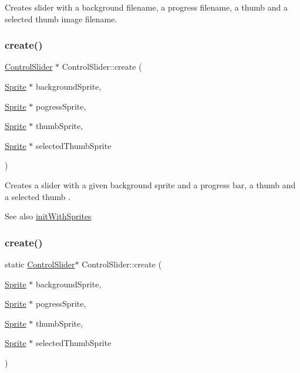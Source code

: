 Creates slider with a background filename, a progress filename, a thumb and a selected thumb image filename. \mbox{\label{classControlSlider_aff78b4e336dd49834bcf0b6982ab620e}} 
\subsubsection{\texorpdfstring{create()}{create()}\hspace{0.1cm}{\footnotesize\ttfamily [7/8]}}
{\footnotesize\ttfamily \hyperlink{classControlSlider}{Control\+Slider} $\ast$ Control\+Slider\+::create (\begin{DoxyParamCaption}\item[{\hyperlink{classSprite}{Sprite} $\ast$}]{background\+Sprite,  }\item[{\hyperlink{classSprite}{Sprite} $\ast$}]{pogress\+Sprite,  }\item[{\hyperlink{classSprite}{Sprite} $\ast$}]{thumb\+Sprite,  }\item[{\hyperlink{classSprite}{Sprite} $\ast$}]{selected\+Thumb\+Sprite }\end{DoxyParamCaption})\hspace{0.3cm}{\ttfamily [static]}}

Creates a slider with a given background sprite and a progress bar, a thumb and a selected thumb .

\begin{DoxySeeAlso}{See also}
\hyperlink{classControlSlider_ad0ff5ce559475048d32b4406a0930da1}{init\+With\+Sprites} 
\end{DoxySeeAlso}
\mbox{\label{classControlSlider_a38a49333cf479f0319bb129ddb9ceda1}} 
\subsubsection{\texorpdfstring{create()}{create()}\hspace{0.1cm}{\footnotesize\ttfamily [8/8]}}
{\footnotesize\ttfamily static \hyperlink{classControlSlider}{Control\+Slider}$\ast$ Control\+Slider\+::create (\begin{DoxyParamCaption}\item[{\hyperlink{classSprite}{Sprite} $\ast$}]{background\+Sprite,  }\item[{\hyperlink{classSprite}{Sprite} $\ast$}]{pogress\+Sprite,  }\item[{\hyperlink{classSprite}{Sprite} $\ast$}]{thumb\+Sprite,  }\item[{\hyperlink{classSprite}{Sprite} $\ast$}]{selected\+Thumb\+Sprite }\end{DoxyParamCaption})\hspace{0.3cm}{\ttfamily [static]}}


